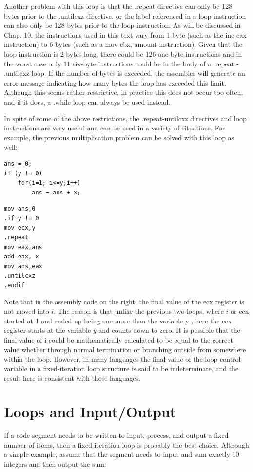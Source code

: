 \documentclass[10pt]{book}
\begin{document}
Another problem with this loop is that the .repeat directive can only be 128 bytes prior to the .untilcxz directive, or the label referenced in a loop instruction can also only be 128 bytes prior to the loop instruction. As will be discussed in Chap. 10, the instructions used in this text vary from 1 byte (such as the inc eax instruction) to 6 bytes (such as a mov ebx, amount instruction). Given that the loop instruction is 2 bytes long, there could be 126 one-byte instructions and in the worst case only 11 six-byte instructions could be in the body of a .repeat - .untilcxz loop. If the number of bytes is exceeded, the assembler will generate an error message indicating how many bytes the loop has exceeded this limit. Although this seems rather restrictive, in practice this does not occur too often, and if it does, a .while loop can always be used instead.

In spite of some of the above restrictions, the .repeat-untilcxz directives and loop instructions are very useful and can be used in a variety of situations. For example, the previous multiplication problem can be solved with this loop as well:

\begin{verbatim}
ans = 0;
if (y != 0)
    for(i=1; i<=y;i++)
        ans = ans + x;
\end{verbatim}

\begin{verbatim}
mov ans,0
.if y != 0
mov ecx,y
.repeat
mov eax,ans
add eax, x
mov ans,eax
.untilcxz
.endif
\end{verbatim}

Note that in the assembly code on the right, the final value of the ecx register is not moved into $i$. The reason is that unlike the previous two loops, where $i$ or ecx started at 1 and ended up being one more than the variable y , here the ecx register starts at the variable $y$ and counts down to zero. It is possible that the final value of i could be mathematically calculated to be equal to the correct value whether through normal termination or branching outside from somewhere within the loop. However, in many languages the final value of the loop control variable in a fixed-iteration loop structure is said to be indeterminate, and the result here is consistent with those languages.

\section{Loops and Input/Output}
If a code segment needs to be written to input, process, and output a fixed number of items, then a fixed-iteration loop is probably the best choice. Although a simple example, assume that the segment needs to input and sum exactly 10 integers and then output the sum:
\end{document}
